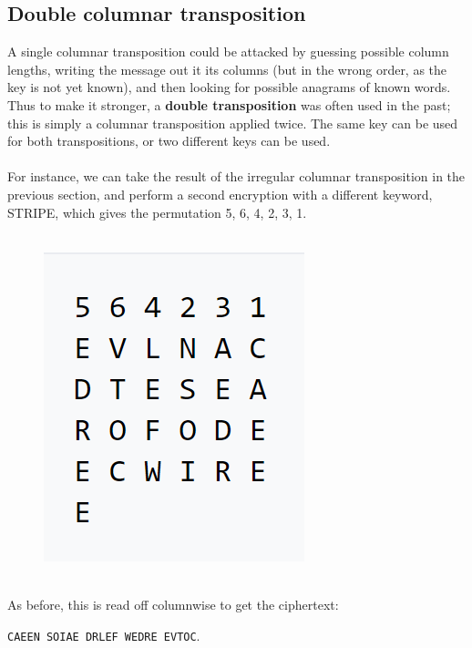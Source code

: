 \documentclass[Lau,binding=0.6cm,oneside]{sapthesis}
\begin{document}
\begin{appendices}
\section{Double columnar transposition}
A single columnar transposition could be attacked by guessing possible column lengths, writing the message out it its columns (but in the wrong order, as the key is not yet known), and then looking for possible anagrams of known words. Thus to make it stronger, a \textbf{double transposition} was often used in the past; this is simply a columnar transposition applied twice. The same key can be used for both transpositions, or two different keys can be used.\\\\
For instance, we can take the result of the irregular columnar transposition in the previous section, and perform a second encryption with a different keyword, \textsf{STRIPE}, which gives the permutation 5, 6, 4, 2, 3, 1.\\\\

\begin{figure}[H]
\includegraphics[scale=0.42]{double_columnar}
\centering
\caption{}
\centering
\end{figure}
\ \\
As before, this is read off columnwise to get the ciphertext: \par\colorbox{gray!12}{\small{\texttt{CAEEN SOIAE DRLEF WEDRE EVTOC}}}.\\\\


\end{appendices}
\end{document}
